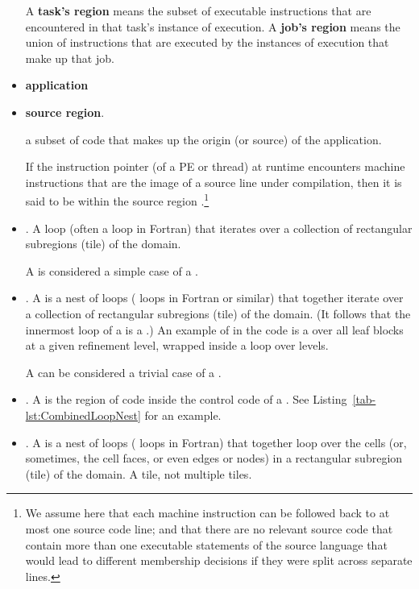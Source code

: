 \documentclass{article}
\begin{document}
\begin{itemize}
A \textbf{task's region} means the subset of executable
instructions that are encountered in that task's instance of execution.
A \textbf{job's region} means the union
of instructions that are executed by the instances of execution that
make up that job.

\item \textbf{application}

\item \textbf{source region}.

a subset of code that makes
up the origin (or source) of the application.

If the instruction pointer (of a PE or thread) at runtime
encounters machine instructions that are the image of a source line
under compilation, then it is said to be within the source region .\footnote{
We assume here that each machine instruction can be followed back
to at most one source code line; and that there are no relevant source code
that contain more than one
executable statements of the source language that would lead
to different membership decisions if they were split across
separate lines.}


\item \textbf{\tileloop}.
A loop (often a  loop in Fortran) that
iterates over a collection of rectangular subregions (tile) of the domain.

A \tileloop is  considered a simple case of a \tileloopnest.

\item \textbf{\tileloopnest}.
A \tileloopnest is a nest of loops ( loops in Fortran or similar) that
together iterate over a collection of rectangular subregions (tile) of the domain.
(It follows that the innermost loop of a \tileloopnest is a \tileloop.)
An example of \tileloopnest in the \FlashOfTheFuture code is a \tileloop over all leaf blocks at a given
refinement level, wrapped inside a loop over levels.

A \tileloop can be considered a trivial case of a \tileloopnest.

\item \textbf{\tileloopbody}.
A \tileloopbody is the region of code inside the control code of a \tileloop.
 See Listing~\ref{tab-lst:CombinedLoopNest} for an example.

\item \textbf{\cellloopnest}.
A \cellloopnest is a nest of loops ( loops in Fortran) that
together loop over the cells (or, sometimes, the cell faces, or even edges or nodes)
in a rectangular subregion (tile) of the domain. A tile, not multiple tiles.


\end{itemize}
\end{document}
